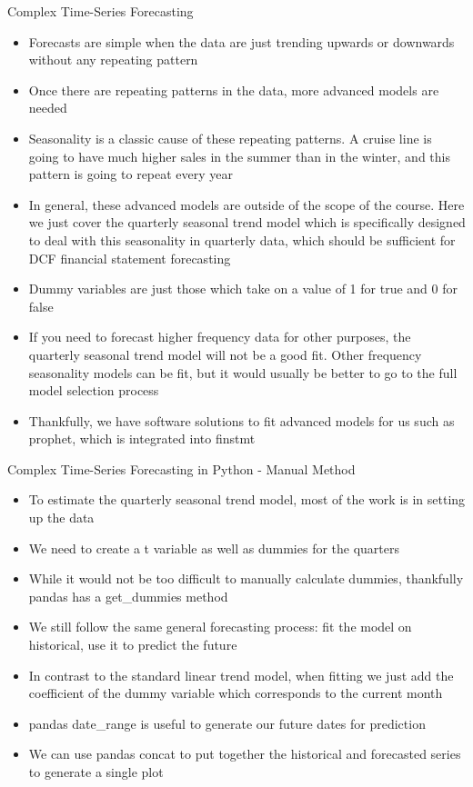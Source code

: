 \documentclass[]{article}
\begin{document}
\begin{section}{Complex Time-Series Forecasting}
\begin{itemize}
\item Forecasts are simple when the data are just trending upwards or downwards without any repeating pattern
\item Once there are repeating patterns in the data, more advanced models are needed
\item Seasonality is a classic cause of these repeating patterns. A cruise line is going to have much higher sales in the summer than in the winter, and this pattern is going to repeat every year
\item In general, these advanced models are outside of the scope of the course. Here we just cover the quarterly seasonal trend model which is specifically designed to deal with this seasonality in quarterly data, which should be sufficient for DCF financial statement forecasting
\item Dummy variables are just those which take on a value of 1 for true and 0 for false
\item If you need to forecast higher frequency data for other purposes, the quarterly seasonal trend model will not be a good fit. Other frequency seasonality models can be fit, but it would usually be better to go to the full model selection process
\item Thankfully, we have software solutions to fit advanced models for us such as prophet, which is integrated into finstmt
\end{itemize}
\end{section}
\begin{section}{Complex Time-Series Forecasting in Python - Manual Method}
\begin{itemize}
\item To estimate the quarterly seasonal trend model, most of the work is in setting up the data
\item We need to create a t variable as well as dummies for the quarters
\item While it would not be too difficult to manually calculate dummies, thankfully pandas has a get\_dummies method
\item We still follow the same general forecasting process: fit the model on historical, use it to predict the future
\item In contrast to the standard linear trend model, when fitting we just add the coefficient of the dummy variable which corresponds to the current month
\item pandas date\_range is useful to generate our future dates for prediction
\item We can use pandas concat to put together the historical and forecasted series to generate a single plot
\end{itemize}
\end{section}
\end{document}
